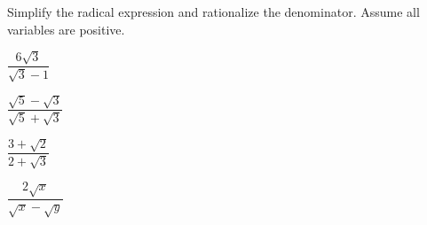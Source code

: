 \begin{exercise}
	Simplify the radical expression and rationalize the denominator. Assume all variables are positive.\\
	\begin{enumerate*}[label={(\arabic*)~}, itemsep=1em]
		\item $\dfrac{6\sqrt3}{\sqrt3-1}$
		\item $\dfrac{\sqrt5-\sqrt3}{\sqrt5+\sqrt3}$
		\item $\dfrac{3+\sqrt2}{2+\sqrt3}$
		\item $\dfrac{2\sqrt{x}}{\sqrt x- \sqrt y}$
		\hfill\null
	\end{enumerate*}
\end{exercise}

\vfill
\begin{center} \hfill
\end{center}